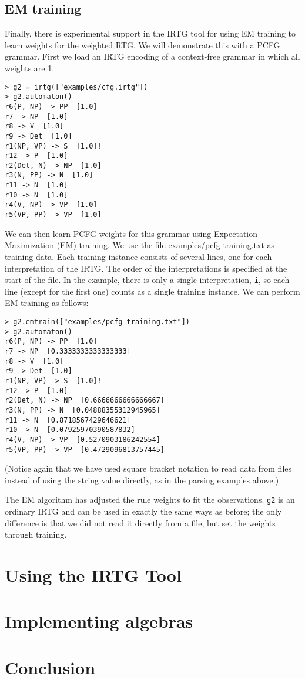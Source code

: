 \documentclass[11pt]{article}
\begin{document}
\subsection{EM training}

Finally, there is experimental support in the IRTG tool for using EM
training to learn weights for the weighted RTG.  We will demonstrate
this with a PCFG grammar. First we load an IRTG encoding of a
context-free grammar in which all weights are 1.

\begin{verbatim}
> g2 = irtg(["examples/cfg.irtg"])
> g2.automaton()
r6(P, NP) -> PP  [1.0]
r7 -> NP  [1.0]
r8 -> V  [1.0]
r9 -> Det  [1.0]
r1(NP, VP) -> S  [1.0]!
r12 -> P  [1.0]
r2(Det, N) -> NP  [1.0]
r3(N, PP) -> N  [1.0]
r11 -> N  [1.0]
r10 -> N  [1.0]
r4(V, NP) -> VP  [1.0]
r5(VP, PP) -> VP  [1.0]
\end{verbatim}

We can then learn PCFG weights for this grammar using Expectation
Maximization (EM) training. We use the file
\url{examples/pcfg-training.txt} as training data. Each training
instance consists of several lines, one for each interpretation of the
IRTG. The order of the interpretations is specified at the start of
the file. In the example, there is only a single interpretation,
\verb?i?, so each line (except for the first one) counts as a single
training instance. We can perform EM training as follows:

\begin{verbatim}
> g2.emtrain(["examples/pcfg-training.txt"])
> g2.automaton()
r6(P, NP) -> PP  [1.0]
r7 -> NP  [0.3333333333333333]
r8 -> V  [1.0]
r9 -> Det  [1.0]
r1(NP, VP) -> S  [1.0]!
r12 -> P  [1.0]
r2(Det, N) -> NP  [0.6666666666666667]
r3(N, PP) -> N  [0.04888355312945965]
r11 -> N  [0.8718567429646621]
r10 -> N  [0.07925970390587832]
r4(V, NP) -> VP  [0.5270903186242554]
r5(VP, PP) -> VP  [0.4729096813757445]
\end{verbatim}

(Notice again that we have used square bracket notation to read data
from files instead of using the string value directly, as in the
parsing examples above.)

The EM algorithm has adjusted the rule weights to fit the
observations. \verb?g2? is an ordinary IRTG and can be used in exactly
the same ways as before; the only difference is that we did not read
it directly from a file, but set the weights through training.


\section{Using the IRTG Tool} \label{sec:using}

\section{Implementing algebras} \label{sec:algebra}

\section{Conclusion} \label{sec:conclusion}





\end{document}
